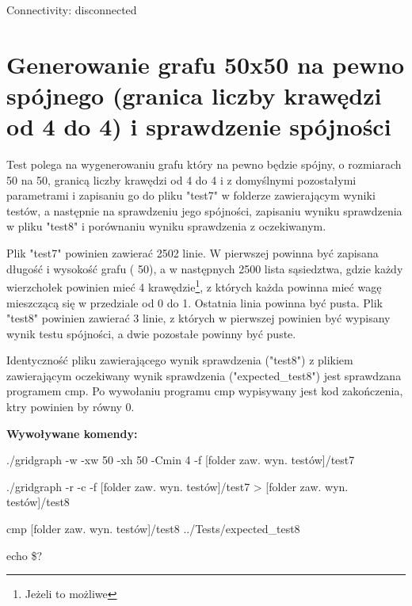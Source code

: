\documentclass[11pt,a4paper]{report}
\def\console #1{\begingroup\fontfamily{qcr}\selectfont#1\endgroup}
\newenvironment{multiconsole}{\begingroup\fontfamily{qcr}\selectfont}{\endgroup}
\begin{document}
    \begin{multiconsole}
        Connectivity: disconnected
    \end{multiconsole}


    \newpage
    \section{Generowanie grafu 50x50 na pewno spójnego (granica liczby krawędzi od 4 do 4) i sprawdzenie spójności}

    Test polega na wygenerowaniu grafu który na pewno będzie spójny, o rozmiarach 50 na 50, granicą liczby krawędzi od 4 do 4 i z domyślnymi pozostałymi parametrami i zapisaniu go do pliku "test7" w folderze zawierającym wyniki testów, a następnie na sprawdzeniu jego spójności, zapisaniu wyniku sprawdzenia w pliku "test8" i porównaniu wyniku sprawdzenia z oczekiwanym.
    
    Plik "test7" powinien zawierać 2502 linie. W pierwszej powinna być zapisana długość i wysokość grafu (\console{50 50}), a w następnych 2500 lista sąsiedztwa, gdzie każdy wierzchołek powinien mieć 4 krawędzie\footnote{Jeżeli to możliwe}, z których każda powinna mieć wagę mieszczącą się w przedziale od 0 do 1. Ostatnia linia powinna być pusta. Plik "test8" powinien zawierać 3 linie, z których w pierwszej powinien być wypisany wynik testu spójności, a dwie pozostałe powinny być puste.
    
    Identyczność pliku zawierającego wynik sprawdzenia ("test8") z plikiem zawierającym oczekiwany wynik sprawdzenia ("expected\_test8") jest sprawdzana programem \console{cmp}. Po wywołaniu programu \console{cmp} wypisywany jest kod zakończenia, ktry powinien by równy 0.

    \vspace{2em}

    \textbf{Wywoływane komendy:}

    \vspace{1em}

    \begin{multiconsole}
        ./gridgraph -w -xw 50 -xh 50 -Cmin 4 -f [folder zaw. wyn. testów]/test7

        ./gridgraph -r -c -f [folder zaw. wyn. testów]/test7 > [folder zaw. wyn. testów]/test8

        cmp [folder zaw. wyn. testów]/test8 ../Tests/expected\_test8

        echo \$?
    \end{multiconsole}
\end{document}
